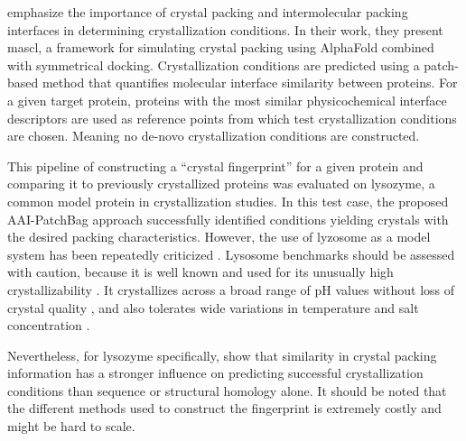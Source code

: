 \citet{Liao2025} emphasize the importance of crystal packing and intermolecular packing interfaces in determining crystallization conditions. In their work, they present \gls{mascl}, a framework for simulating crystal packing using AlphaFold combined with symmetrical docking. Crystallization conditions are predicted using a patch-based method that quantifies molecular interface similarity between proteins. For a given target protein, proteins with the most similar physicochemical interface descriptors are used as reference points from which test crystallization conditions are chosen. Meaning no de-novo crystallization conditions are constructed. 

This pipeline of constructing a “crystal fingerprint” for a given protein and comparing it to previously crystallized proteins was evaluated on lysozyme, a common model protein in crystallization studies. In this test case, the proposed AAI-PatchBag approach successfully identified conditions yielding crystals with the desired packing characteristics. However, the use of lyzosome as a model system has been repeatedly criticized \citep{Chayen2001}. Lysosome benchmarks should be assessed with caution, because it is well known and used for its unusually high crystallizability \citep{Ghosh2023}. It crystallizes across a broad range of pH values without loss of crystal quality \citep{Iwai2008}, and also tolerates wide variations in temperature and salt concentration \citep{Ataka1988}.

Nevertheless, for lysozyme specifically, \citet{Liao2025} show that similarity in crystal packing information has a stronger influence on predicting successful crystallization conditions than sequence or structural homology alone. It should be noted that the different methods used to construct the fingerprint is extremely costly and might be hard to scale.

